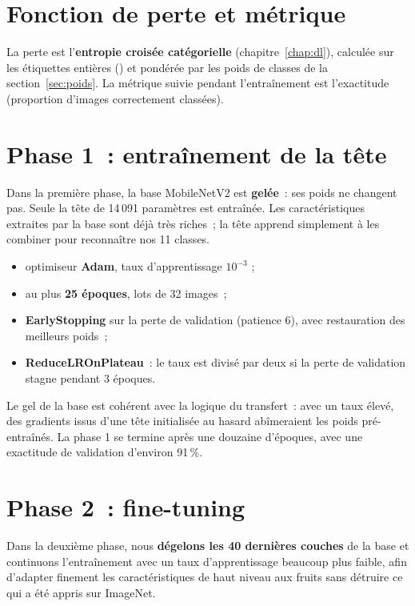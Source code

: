 \section{Fonction de perte et métrique}

La perte est l’\textbf{entropie croisée catégorielle} (chapitre~\ref{chap:dl}), calculée sur les étiquettes entières () et pondérée par les poids de classes de la section~\ref{sec:poids}. La métrique suivie pendant l’entraînement est l’exactitude (proportion d’images correctement classées).

\section{Phase 1~: entraînement de la tête}

Dans la première phase, la base MobileNetV2 est \textbf{gelée}~: ses poids ne changent pas. Seule la tête de 14\,091 paramètres est entraînée. Les caractéristiques extraites par la base sont déjà très riches~; la tête apprend simplement à les combiner pour reconnaître nos 11 classes.

\begin{itemize}
  \item optimiseur \textbf{Adam}, taux d’apprentissage $10^{-3}$ ;
  \item au plus \textbf{25 époques}, lots de 32 images~;
  \item \textbf{EarlyStopping} sur la perte de validation (patience 6), avec restauration des meilleurs poids~;
  \item \textbf{ReduceLROnPlateau}~: le taux est divisé par deux si la perte de validation stagne pendant 3 époques.
\end{itemize}

Le gel de la base est cohérent avec la logique du transfert~: avec un taux élevé, des gradients issus d’une tête initialisée au hasard abîmeraient les poids pré-entraînés. La phase 1 se termine après une douzaine d’époques, avec une exactitude de validation d’environ 91\,\%.

\section{Phase 2~: fine-tuning}\label{sec:finetune}

Dans la deuxième phase, nous \textbf{dégelons les 40 dernières couches} de la base et continuons l’entraînement avec un taux d’apprentissage beaucoup plus faible, afin d’adapter finement les caractéristiques de haut niveau aux fruits sans détruire ce qui a été appris sur ImageNet.

